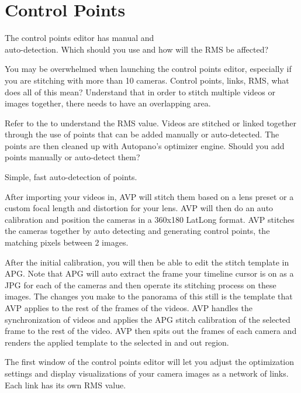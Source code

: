 \section{Control Points}
\pagecolor{white}
\label{chap:36}
\begin{fullwidth}

\problem

{\large The control points editor has manual and 
\\ 
auto-detection. Which should you use and how will the RMS be affected? \par}

You may be overwhelmed when launching the control points editor, especially if you are stitching with more than 10 cameras. Control points, links, RMS, what does all of this mean? Understand that in order to stitch multiple videos or images together, there needs to have an overlapping area. 

Refer to the \textbf{} to understand the RMS value. Videos are stitched or linked together through the use of points that can be added manually or auto-detected. The points are then cleaned up with Autopano’s optimizer engine. Should you add points manually or auto-detect them?

\solutions

{\large Simple, fast auto-detection of points. \par}

After importing your videos in, AVP will stitch them based on a lens preset or a custom focal length and distortion for your lens. AVP will then do an auto calibration and position the cameras in a 360x180 LatLong format. AVP stitches the cameras together by auto detecting and generating control points, the matching pixels between 2 images.

After the initial calibration, you will then be able to edit the stitch template in APG. Note that APG will auto extract the frame your timeline cursor is on as a JPG for each of the cameras and then operate its stitching process on these images. The changes you make to the panorama of this still is the template that AVP applies to the rest of the frames of the videos. AVP handles the synchronization of videos and applies the APG stitch calibration of the selected frame to the rest of the video. AVP then spits out the frames of each camera and renders the applied template to the selected in and out region. 

The first window of the control points editor will let you adjust the optimization settings and display visualizations of your camera images as a network of links. Each link has its own RMS value.


\end{fullwidth}
